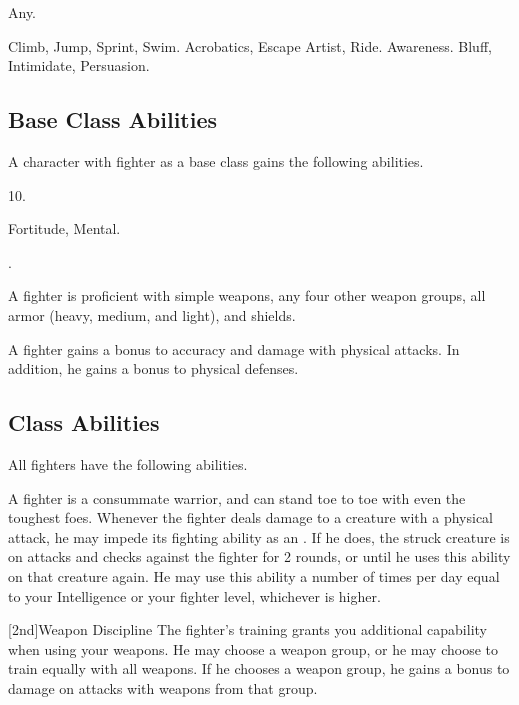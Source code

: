      Any.

     Climb, Jump, Sprint, Swim.
     Acrobatics, Escape Artist, Ride.
     Awareness.
     Bluff, Intimidate, Persuasion.

    \subsection{Base Class Abilities}
        A character with fighter as a base class gains the following abilities.

         10.

          Fortitude,  Mental.

         .

        A fighter is proficient with simple weapons, any four other weapon groups,  all armor (heavy, medium, and light), and shields.

        A fighter gains a  bonus to accuracy and damage with physical attacks.
        In addition, he gains a  bonus to physical defenses.

    \subsection{Class Abilities}
        All fighters have the following abilities.

        A fighter is a consummate warrior, and can stand toe to toe with even the toughest foes.
        Whenever the fighter deals damage to a creature with a physical attack, he may impede its fighting ability as an .
        If he does, the struck creature is \impaired on attacks and checks against the fighter for 2 rounds, or until he uses this ability on that creature again.
        He may use this ability a number of times per day equal to your Intelligence or your fighter level, whichever is higher.

        [2nd]{Weapon Discipline}
        The fighter's training grants you additional capability when using your weapons.
        He may choose a weapon group, or he may choose to train equally with all weapons.
        If he chooses a weapon group, he gains a  bonus to damage on attacks with weapons from that group.

